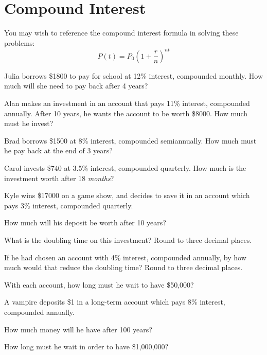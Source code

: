 \section*{Compound Interest}
You may wish to reference the compound interest formula in solving these problems:
$$P(t)=P_0\left(1+\frac{r}{n}\right)^{nt}$$
\begin{senum}
\item Julia borrows \$1800 to pay for school at 12\% interest, compounded monthly.  How much will she need to pay back after 4 years?
\item Alan makes an investment in an account that pays 11\% interest, compounded annually.  After 10 years, he wants the account to be worth \$8000.  How much must he invest?
\item Brad borrows \$1500 at 8\% interest, compounded semiannually.  How much must he pay back at the end of 3 years?
\item Carol invests \$740 at 3.5\% interest, compounded quarterly.  How much is the investment worth after 18 \emph{months}?
\item Kyle wins \$17000 on a game show, and decides to save it in an account which pays 3\% interest, compounded quarterly.
\begin{clist}
\item How much will his deposit be worth after 10 years?
\item What is the doubling time on this investment? Round to three decimal places.
\item If he had chosen an account with 4\% interest, compounded annually, by how much would that reduce the doubling time? Round to three decimal places.
\item With each account, how long must he wait to have \$50,000?
\end{clist}
\item A vampire deposits \$1 in a long-term account which pays 8\% interest, compounded annually.
\begin{clist}
\item How much money will he have after 100 years?
\item How long must he wait in order to have \$1,000,000?
\end{clist}
\end{senum}

